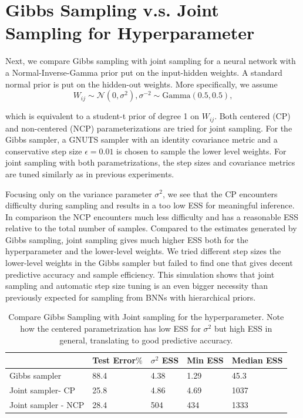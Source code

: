 \documentclass[12pt]{report}
\begin{document}
\section{Gibbs Sampling v.s. Joint Sampling for Hyperparameter }

Next, we compare Gibbs sampling with joint sampling for a neural network with a Normal-Inverse-Gamma prior put on the input-hidden weights. A standard normal prior is put on the hidden-out weights. More specifically, we assume 
\[W_{ij} \sim \mathcal{N}(0,\sigma^2), \sigma^{-2} \sim \text{Gamma}(0.5,0.5), \]

which is equivalent to a student-t prior of degree 1 on $W_{ij}$. Both centered (CP) and non-centered (NCP) parameterizations are tried for joint sampling. For the Gibbs sampler, a GNUTS sampler with an identity covariance metric and a conservative step size $\epsilon = 0.01$ is chosen to sample the lower level weights. For joint sampling with both parametrizations, the step sizes and covariance metrics are tuned similarly as in previous experiments.

Focusing only on the variance parameter $\sigma^2$, we see that the CP encounters difficulty during sampling and results in a too low ESS for meaningful inference. In comparison the NCP encounters much less difficulty and has a reasonable ESS relative to the total number of samples. Compared to the  estimates generated by Gibbs sampling, joint sampling gives much higher ESS both for the hyperparameter and the lower-level weights. We tried different step sizes the lower-level weights in the Gibbs sampler but failed to find one that gives decent predictive accuracy and sample efficiency. This simulation shows that joint sampling and automatic step size tuning is an even bigger necessity than previously expected for sampling from BNNs with hierarchical priors.

\begin{table}[]
\centering
\begin{tabular}{@{}lllll@{}}
\toprule
              & Test Error$\%$ & $\sigma^2$ ESS & Min ESS & Median ESS \\ \midrule
Gibbs sampler & 88.4        & 4.38         & 1.29      & 45.3       \\ \midrule
Joint sampler- CP     & 25.8      & 4.86       & 4.69     & 1037         \\ \midrule
Joint sampler - NCP   & 28.4      & 504         & 434     & 1333        \\ \bottomrule
\end{tabular}
\caption{Compare Gibbs Sampling with Joint sampling for the hyperparameter. Note how the centered parametrization has low ESS for $\sigma^2 $ but high ESS in general, translating to good predictive accuracy. }
\label{my-label}
\end{table}
\end{document}
